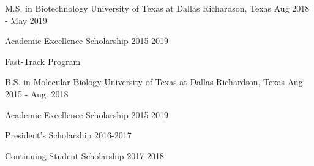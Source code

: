 

\begin{cventries}

  \cventry
    {M.S. in Biotechnology} %
    {University of Texas at Dallas} %
    {Richardson, Texas} %
    {Aug 2018 - May 2019} %
    {
      \begin{cvitems} %
        \item {Academic Excellence Scholarship 2015-2019}
        \item {Fast-Track Program}
      \end{cvitems}
    }

  \cventry
    {B.S. in Molecular Biology} %
    {University of Texas at Dallas} %
    {Richardson, Texas} %
    {Aug 2015 - Aug. 2018} %
    {
      \begin{cvitems} %
        \item {Academic Excellence Scholarship 2015-2019}
        \item {President's Scholarship 2016-2017}
        \item {Continuing Student Scholarship 2017-2018}
      \end{cvitems}
    }

\end{cventries}
